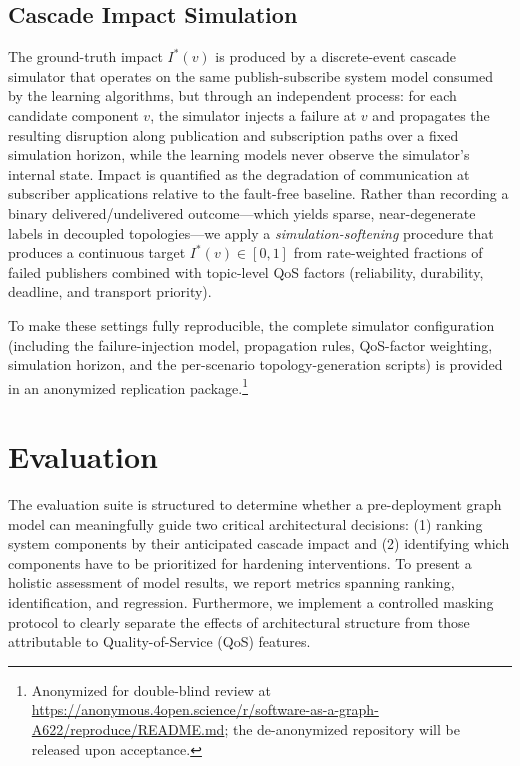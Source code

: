 \documentclass[sigconf,9pt,anonymous]{acmart}
\begin{document}
\subsection{Cascade Impact Simulation}

The ground-truth impact $I^*(v)$ is produced by a discrete-event cascade simulator that operates on the same publish-subscribe system model consumed by the learning algorithms, but through an independent process: for each candidate component $v$, the simulator injects a failure at $v$ and propagates the resulting disruption along publication and subscription paths over a fixed simulation horizon, while the learning models never observe the simulator's internal state. Impact is quantified as the degradation of communication at subscriber applications relative to the fault-free baseline. Rather than recording a binary delivered/undelivered outcome---which yields sparse, near-degenerate labels in decoupled topologies---we apply a \emph{simulation-softening} procedure that produces a continuous target $I^*(v)\in[0,1]$ from rate-weighted fractions of failed publishers combined with topic-level QoS factors (reliability, durability, deadline, and transport priority).

To make these settings fully reproducible, the complete simulator configuration (including the failure-injection model, propagation rules, QoS-factor weighting, simulation horizon, and the per-scenario topology-generation scripts) is provided in an anonymized replication package.\footnote{Anonymized for double-blind review at \url{https://anonymous.4open.science/r/software-as-a-graph-A622/reproduce/README.md}; the de-anonymized repository will be released upon acceptance.}

\section{Evaluation}

The evaluation suite is structured to determine whether a pre-deployment graph model can meaningfully guide two critical architectural decisions: (1) ranking system components by their anticipated cascade impact and (2) identifying which components have to be prioritized for hardening interventions. To present a holistic assessment of model results, we report metrics spanning ranking, identification, and regression. Furthermore, we implement a controlled masking protocol to clearly separate the effects of architectural structure from those attributable to Quality-of-Service (QoS) features.
\end{document}
